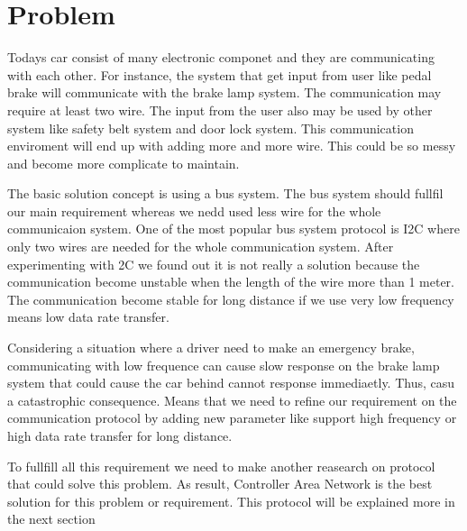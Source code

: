 
\section{Problem}

Todays car consist of many electronic componet and they are communicating with each other.  For instance, the system that get input from user like pedal brake will communicate with the brake lamp system. The communication may require at least two wire. The input from the user also may be used by other system like safety belt system and door lock system. This  communication enviroment will end up with adding more and more wire. This could be so messy and become more complicate to maintain.

The basic solution concept is using a bus system. The bus system should fullfil our main requirement whereas we nedd used less wire for the whole communicaion system. One of the most popular bus system protocol is I2C where only two wires are needed for the whole communication system. After experimenting with 2C we found out it is not really a solution because the communication become unstable when the length of the wire more than 1 meter. The communication become stable for long distance if we use very low frequency means low data rate transfer. 

Considering a situation where a driver need to make an emergency brake, communicating with low frequence can cause slow response on the brake lamp system that could cause the car behind cannot response immediaetly. Thus, casu a catastrophic consequence. Means that we need to refine our requirement on the communication protocol by adding new parameter like support high frequency or high data rate transfer for long distance. 

To fullfill all this requirement we need to make another reasearch on protocol that could solve this problem. As result, Controller Area Network is the best solution for this problem or requirement. This protocol will be explained more in the next section




